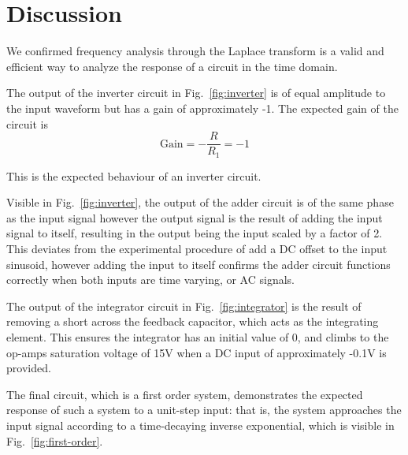 \section{Discussion}\label{sec:discussion}
We confirmed frequency analysis through the Laplace transform is a valid and efficient way to analyze the response of a circuit in the time domain.

The output of the inverter circuit in Fig.~\ref{fig:inverter} is of equal amplitude to the input waveform but has a gain of approximately -1. The expected gain of the circuit is 
\begin{equation}
	\text{Gain} = -\frac{R}{R_1} = -1
\end{equation}

This is the expected behaviour of an inverter circuit.

Visible in Fig.~\ref{fig:inverter}, the output of the adder circuit is of the same phase as the input signal however the output signal is the result of adding the input signal to itself, resulting in the output being the input scaled by a factor of 2. This deviates from the experimental procedure of add a DC offset to the input sinusoid, however adding the input to itself confirms the adder circuit functions correctly when both inputs are time varying, or AC signals.

The output of the integrator circuit in Fig.~\ref{fig:integrator} is the result of removing a short across the feedback capacitor, which acts as the integrating element. This ensures the integrator has an initial value of 0, and climbs to the op-amps saturation voltage of 15\si{\volt} when a DC input of approximately -0.1\si{\volt} is provided.

The final circuit, which is a first order system, demonstrates the expected response of such a system to a unit-step input: that is, the system approaches the input signal according to a time-decaying inverse exponential, which is visible in Fig.~\ref{fig:first-order}.
